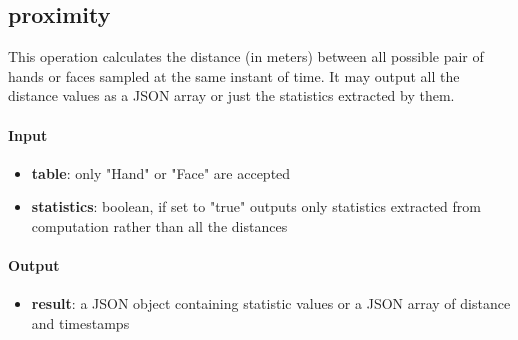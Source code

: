 \documentclass[a4paper,notitlepage,onecolumn]{hitec}  %
\begin{document}
\subsection{proximity}
This operation calculates the distance (in meters) between all possible pair of hands or faces sampled at the same instant of time. It may output all the distance values as a JSON array or just the statistics extracted by them.

\paragraph{Input}
\begin{itemize}
\item\textbf{table}: only "Hand" or "Face" are accepted 
\item\textbf{statistics}: boolean, if set to "true" outputs only statistics extracted from computation rather than all the distances
\end{itemize}

\paragraph{Output}
\begin{itemize}
\item\textbf{result}: a JSON object containing statistic values or a JSON array of distance and timestamps
\end{itemize}
\end{document}
